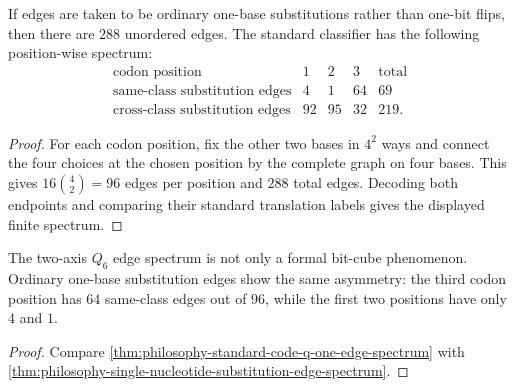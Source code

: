 \begin{theorem}
\label{thm:philosophy-single-nucleotide-substitution-edge-spectrum}
If edges are taken to be ordinary one-base substitutions rather than
one-bit flips, then there are $288$ unordered edges. The standard
classifier has the following position-wise spectrum:
$$
\begin{array}{c|rrr|r}
  \text{codon position} & 1 & 2 & 3 & \text{total}\\
\hline
  \text{same-class substitution edges} & 4 & 1 & 64 & 69\\
  \text{cross-class substitution edges} & 92 & 95 & 32 & 219.
\end{array}
$$
\end{theorem}
\begin{proof}
For each codon position, fix the other two bases in $4^{2}$ ways and
connect the four choices at the chosen position by the complete graph
on four bases. This gives $16\binom{4}{2}=96$ edges per position and
$288$ total edges. Decoding both endpoints and comparing their standard
translation labels gives the displayed finite spectrum.
\end{proof}

\begin{corollary}
\label{cor:philosophy-two-axis-stability-matches-nucleotide-substitution}
The two-axis $Q_{6}$ edge spectrum is not only a formal bit-cube
phenomenon. Ordinary one-base substitution edges show the same
asymmetry: the third codon position has $64$ same-class edges out of
$96$, while the first two positions have only $4$ and $1$.
\end{corollary}
\begin{proof}
Compare \autoref{thm:philosophy-standard-code-q-one-edge-spectrum} with
\autoref{thm:philosophy-single-nucleotide-substitution-edge-spectrum}.
\end{proof}


